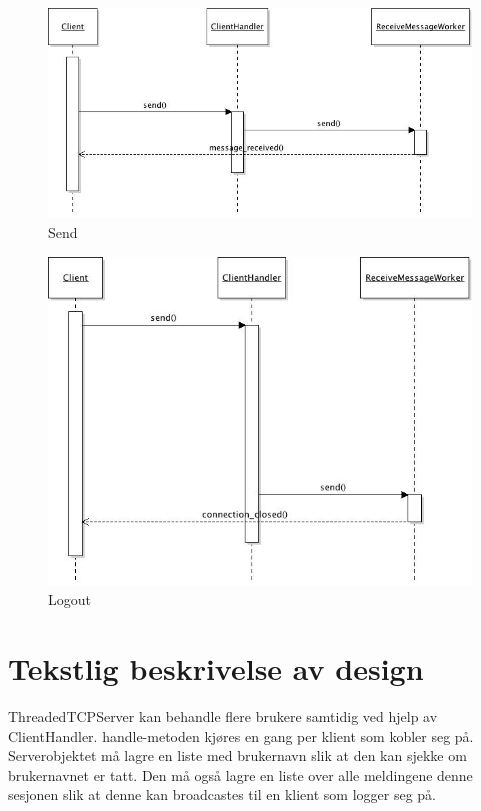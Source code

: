 \documentclass[a4paper,12pt, norsk]{article}
\begin{document}
\begin{figure}[!htb]
\centerline{\includegraphics[scale=0.75]{send}}
\caption{Send}
\label{fig:send}
\end{figure}

\begin{figure}[!htb]
\centerline{\includegraphics[scale=0.75]{logout}}
\caption{Logout}
\label{fig:logout}
\end{figure}

\clearpage



\section*{Tekstlig beskrivelse av design}
ThreadedTCPServer kan behandle flere brukere samtidig ved hjelp av ClientHandler. handle-metoden kjøres en gang per klient som kobler seg på. Serverobjektet må lagre en liste med brukernavn slik at den kan sjekke om brukernavnet er tatt. Den må også lagre en liste over alle meldingene denne sesjonen slik at denne kan broadcastes til en klient som logger seg på. 
\end{document}
